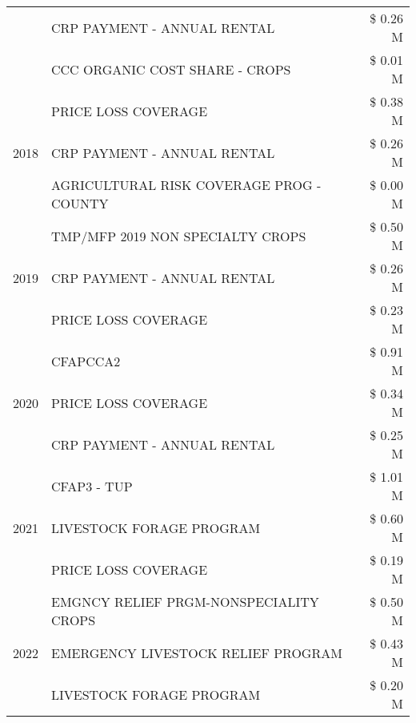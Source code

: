 \begin{tabular}{llr}
 & CRP PAYMENT - ANNUAL RENTAL & \$ 0.26 M \\
 & CCC ORGANIC COST SHARE - CROPS & \$ 0.01 M \\
\cline{1-3}
\multirow[t]{3}{*}{2018} & PRICE LOSS COVERAGE & \$ 0.38 M \\
 & CRP PAYMENT - ANNUAL RENTAL & \$ 0.26 M \\
 & AGRICULTURAL RISK COVERAGE PROG - COUNTY & \$ 0.00 M \\
\cline{1-3}
\multirow[t]{3}{*}{2019} & TMP/MFP 2019 NON SPECIALTY CROPS & \$ 0.50 M \\
 & CRP PAYMENT - ANNUAL RENTAL & \$ 0.26 M \\
 & PRICE LOSS COVERAGE & \$ 0.23 M \\
\cline{1-3}
\multirow[t]{3}{*}{2020} & CFAPCCA2 & \$ 0.91 M \\
 & PRICE LOSS COVERAGE & \$ 0.34 M \\
 & CRP PAYMENT - ANNUAL RENTAL & \$ 0.25 M \\
\cline{1-3}
\multirow[t]{3}{*}{2021} & CFAP3 - TUP & \$ 1.01 M \\
 & LIVESTOCK FORAGE PROGRAM & \$ 0.60 M \\
 & PRICE LOSS COVERAGE & \$ 0.19 M \\
\cline{1-3}
\multirow[t]{3}{*}{2022} & EMGNCY RELIEF PRGM-NONSPECIALITY CROPS & \$ 0.50 M \\
 & EMERGENCY LIVESTOCK RELIEF PROGRAM & \$ 0.43 M \\
 & LIVESTOCK FORAGE PROGRAM & \$ 0.20 M \\
\cline{1-3}
\bottomrule
\end{tabular}
